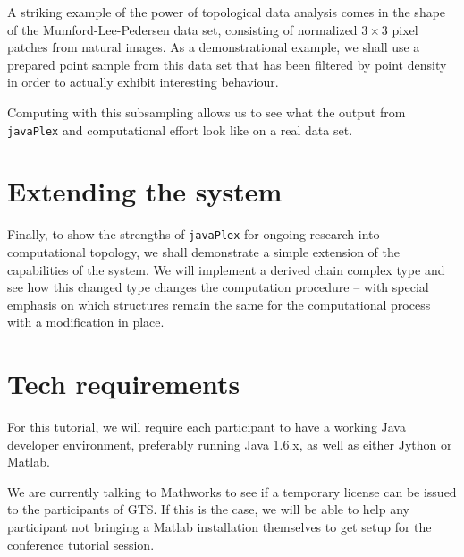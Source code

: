 \documentclass{amsart}
\newcommand\javaPlex{\texttt{javaPlex}\xspace}
\begin{document}
A striking example of the power of topological data analysis comes in the shape of the Mumford-Lee-Pedersen data set, consisting of normalized $3\times 3$ pixel patches from natural images. As a demonstrational example, we shall use a prepared point sample from this data set that has been filtered by point density in order to actually exhibit interesting behaviour.

Computing with this subsampling allows us to see what the output from \javaPlex and computational effort look like on a real data set. 

\section{Extending the system}
\label{sec:extending-system}

Finally, to show the strengths of \javaPlex for ongoing research into computational topology, we shall demonstrate a simple extension of the capabilities of the system. We will implement a derived chain complex type and see how this changed type changes the computation procedure -- with special emphasis on which structures remain the same for the computational process with a modification in place.

\section{Tech requirements}
\label{sec:tech-requirements}

For this tutorial, we will require each participant to have a working Java developer environment, preferably running Java 1.6.x, as well as either Jython or Matlab.

We are currently talking to Mathworks to see if a temporary license can be issued to the participants of GTS. If this is the case, we will be able to help any participant not bringing a Matlab installation themselves to get setup for the conference tutorial session. 
\end{document}
